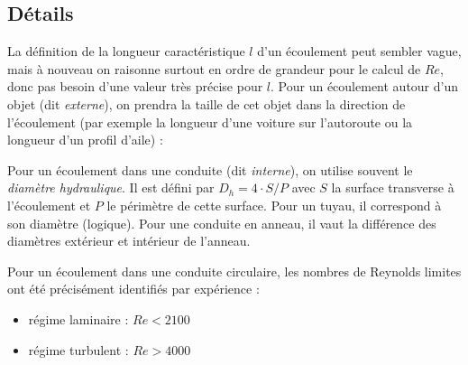 \subsection{Détails}\label{sec:Re_details}
La définition de la longueur caractéristique $l$ d'un écoulement peut sembler vague, mais à nouveau on raisonne surtout en ordre de grandeur pour le calcul de $Re$, donc pas besoin d'une valeur très précise pour $l$. Pour un écoulement autour d'un objet (dit \textit{externe}), on prendra la taille de cet objet dans la direction de l'écoulement (par exemple la longueur d'une voiture sur l'autoroute ou la longueur d'un profil d'aile) :
%
\begin{center}
\end{center}
%
Pour un écoulement dans une conduite (dit \textit{interne}), on utilise souvent le \textit{diamètre hydraulique}. Il est défini par $D_h = 4 \cdot S/P$ avec $S$ la surface transverse à l'écoulement et $P$ le périmètre de cette surface. Pour un tuyau, il correspond à son diamètre (logique). Pour une conduite en anneau, il vaut la différence des diamètres extérieur et intérieur de l'anneau.

Pour un écoulement dans une conduite circulaire, les nombres de Reynolds limites ont été précisément identifiés par expérience :
\begin{itemize}
    \item régime laminaire : $Re<2100$
    \item régime turbulent : $Re>4000$
\end{itemize}

